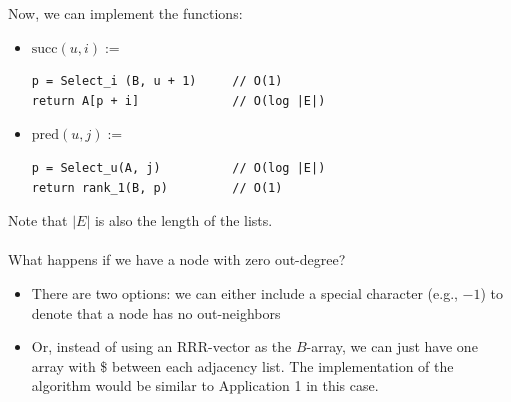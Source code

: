 \documentclass[10pt]{article}
\begin{document}
Now, we can implement the functions:
\begin{itemize}
	\item $\text{succ}(u, i) :=$
	\begin{verbatim}
p = Select_i (B, u + 1)     // O(1)
return A[p + i]             // O(log |E|)
    \end{verbatim}
    \item $\text{pred}(u, j) :=$
    \begin{verbatim}
p = Select_u(A, j)          // O(log |E|)
return rank_1(B, p)         // O(1)
    \end{verbatim}
\end{itemize}
Note that $|E|$ is also the length of the lists.\\\\
What happens if we have a node with zero out-degree?
\begin{itemize}
	\item There are two options: we can either include a special character (e.g., $-1$) to denote that a node has no out-neighbors
	\item Or, instead of using an RRR-vector as the $B$-array, we can just have one array with \$ between each adjacency list.  The implementation of the algorithm would be similar to Application 1 in this case.
\end{itemize}
\end{document}
